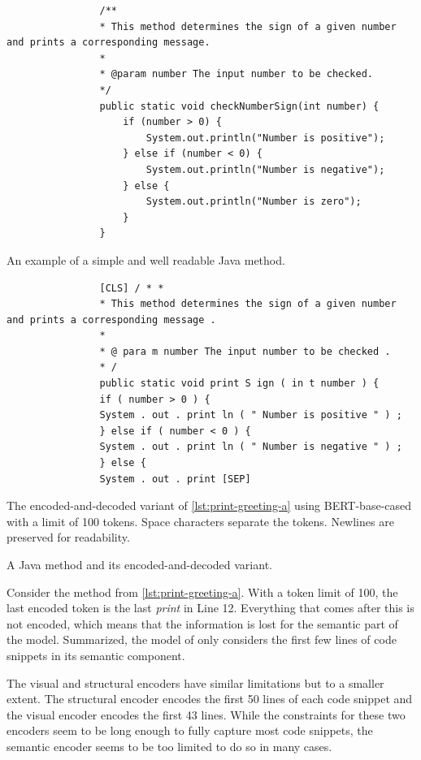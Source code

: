 \documentclass[%
class=scrreprt,
chapterprefix=false,%
open=right,%
twoside=true,%
paper=a4,%
logofile={Logo\_zentral\_farbig\_EN.png},%
thesistype=master,%
UKenglish,%
]{se2thesis}
\theoremstyle{definition}
\begin{document}
	\begin{listing}[p]
		\begin{sublisting}{\linewidth}
			\begin{verbatim}
				/**
				* This method determines the sign of a given number and prints a corresponding message.
				*
				* @param number The input number to be checked.
				*/
				public static void checkNumberSign(int number) {
					if (number > 0) {
						System.out.println("Number is positive");
					} else if (number < 0) {
						System.out.println("Number is negative");
					} else {
						System.out.println("Number is zero");
					}
				}
			\end{verbatim}
			\caption{An example of a simple and well readable Java method.}
			\label{lst:print-greeting-a}
		\end{sublisting}
		
		\begin{sublisting}{\linewidth}
			\begin{verbatim}
				[CLS] / * *
				* This method determines the sign of a given number and prints a corresponding message .
				*
				* @ para m number The input number to be checked .
				* /
				public static void print S ign ( in t number ) {
				if ( number > 0 ) {
				System . out . print ln ( " Number is positive " ) ;
				} else if ( number < 0 ) {
				System . out . print ln ( " Number is negative " ) ;
				} else {
				System . out . print [SEP]
			\end{verbatim}
			\caption{The encoded-and-decoded variant of \autoref{lst:print-greeting-a} using BERT-base-cased with a limit of 100 tokens. Space characters separate the tokens. Newlines are preserved for readability.}
			\label{lst:print-greeting-b}
		\end{sublisting}
		\caption{A Java method and its encoded-and-decoded variant.}
		\label{lst:print-greeting}
	\end{listing}
	
	Consider the method from \autoref{lst:print-greeting-a}. With a token limit of 100, the last encoded token is the last \textit{print} in Line 12. Everything that comes after this is not encoded, which means that the information is lost for the semantic part of the model. Summarized, the model of \citeauthor{mi2022towards} only considers the first few lines of code snippets in its semantic component.
	
	The visual and structural encoders have similar limitations but to a smaller extent. The structural encoder encodes the first 50 lines of each code snippet and the visual encoder encodes the first 43 lines. While the constraints for these two encoders seem to be long enough to fully capture most code snippets, the semantic encoder seems to be too limited to do so in many cases.
\end{document}
